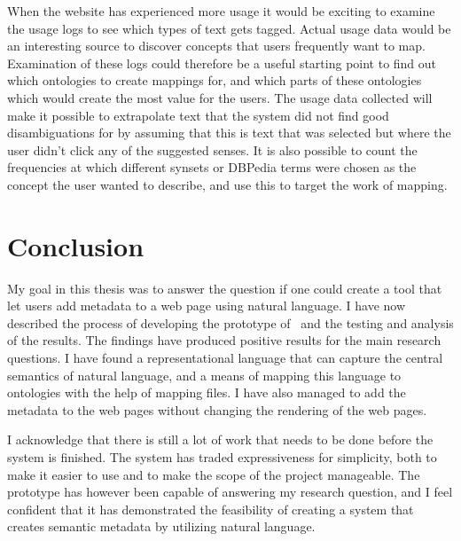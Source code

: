 When the website has experienced more usage it would be exciting to examine the usage logs to see which types of text gets tagged.
Actual usage data would be an interesting source to discover concepts that users frequently want to map.
Examination of these logs could therefore be a useful starting point to find out which ontologies to create mappings for,
and which parts of these ontologies which would create the most value for the users.
The usage data collected will make it possible to extrapolate text that the system did not find good disambiguations for
by assuming that this is text that was selected but where the user didn't click any of the suggested senses.
It is also possible to count the frequencies at which different synsets or DBPedia terms were chosen as the concept the
user wanted to describe, and use this to target the work of mapping.

\section{Conclusion}
My goal in this thesis was to answer the question if one could create a tool that let users add metadata to a web page using
natural language.
I have now described the process of developing the prototype of \theartefact\ and the testing and analysis of the results.
The findings have produced positive results for the main research questions.
I have found a representational language that can capture the central semantics of natural language,
and a means of mapping this language to ontologies with the help of mapping files.
I have also managed to add the metadata to the web pages without changing the rendering of the web pages.

I acknowledge that there is still a lot of work that needs to be done before the system is finished.
The system has traded expressiveness for simplicity, both to make it easier to use and to make the scope of the project manageable.
The prototype has however been capable of answering my research question,
and I feel confident that it has demonstrated the feasibility of creating a system that creates semantic metadata by
utilizing natural language.
